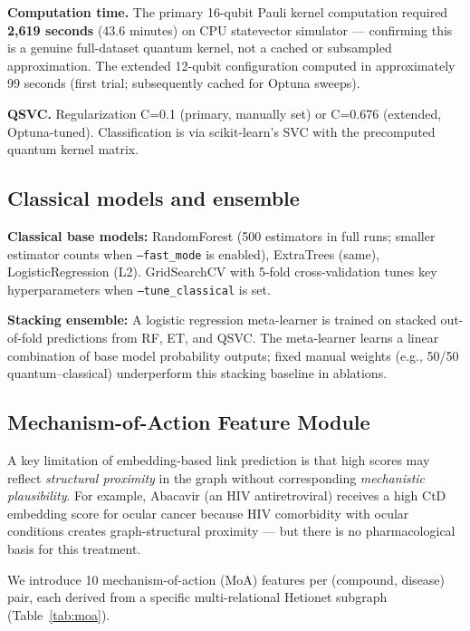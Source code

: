 \documentclass[twocolumn,10pt]{article}
\begin{document}
\textbf{Computation time.} The primary 16-qubit Pauli kernel computation required \textbf{2,619 seconds} (43.6 minutes) on CPU statevector simulator --- confirming this is a genuine full-dataset quantum kernel, not a cached or subsampled approximation. The extended 12-qubit configuration computed in approximately 99 seconds (first trial; subsequently cached for Optuna sweeps).

\textbf{QSVC.} Regularization C=0.1 (primary, manually set) or C=0.676 (extended, Optuna-tuned). Classification is via scikit-learn's SVC with the precomputed quantum kernel matrix.

\subsection{Classical models and ensemble}

\textbf{Classical base models:} RandomForest (500 estimators in full runs; smaller estimator counts when \texttt{--fast\_mode} is enabled), ExtraTrees (same), LogisticRegression (L2). GridSearchCV with 5-fold cross-validation tunes key hyperparameters when \texttt{--tune\_classical} is set.

\textbf{Stacking ensemble:} A logistic regression meta-learner is trained on stacked out-of-fold predictions from RF, ET, and QSVC. The meta-learner learns a linear combination of base model probability outputs; fixed manual weights (e.g., 50/50 quantum--classical) underperform this stacking baseline in ablations.

\subsection{Mechanism-of-Action Feature Module}\label{sec:moa}

A key limitation of embedding-based link prediction is that high scores may reflect \textit{structural proximity} in the graph without corresponding \textit{mechanistic plausibility}. For example, Abacavir (an HIV antiretroviral) receives a high CtD embedding score for ocular cancer because HIV comorbidity with ocular conditions creates graph-structural proximity --- but there is no pharmacological basis for this treatment.

We introduce 10 mechanism-of-action (MoA) features per (compound, disease) pair, each derived from a specific multi-relational Hetionet subgraph (Table~\ref{tab:moa}).
\end{document}
